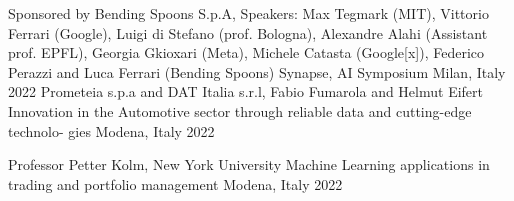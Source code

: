 

\begin{cventries}
  \cventry
    {Sponsored by Bending Spoons S.p.A, Speakers: Max Tegmark (MIT), Vittorio Ferrari (Google), Luigi di Stefano (prof. Bologna), Alexandre Alahi (Assistant prof. EPFL), Georgia Gkioxari (Meta), Michele Catasta (Google[x]), Federico Perazzi and Luca Ferrari (Bending Spoons)} %
    {Synapse, AI Symposium} %
    {Milan, Italy} %
    {2022} %
    {
    }
  \cventry
    {Prometeia s.p.a and DAT Italia s.r.l, Fabio Fumarola and Helmut Eifert } %
    {Innovation in the Automotive sector through reliable data and cutting-edge technolo-
gies} %
    {Modena, Italy} %
    {2022} %
    {
    }

  \cventry
    {Professor Petter Kolm, New York University} %
    {Machine Learning applications in trading and portfolio management } %
    {Modena, Italy} %
    {2022} %
    {
    }


\end{cventries}
